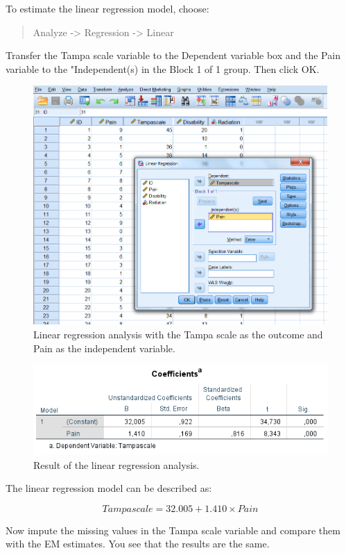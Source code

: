 \documentclass[
]{book}
\begin{document}
To estimate the linear regression model, choose:

\begin{quote}
Analyze -\textgreater{} Regression -\textgreater{} Linear
\end{quote}

Transfer the Tampa scale variable to the Dependent variable box and the
Pain variable to the "Independent(s) in the Block 1 of 1 group. Then
click OK.

\begin{figure}

{\centering \includegraphics[width=0.7\linewidth]{images/fig3.14} 

}

\caption{Linear regression analysis with the Tampa scale as the outcome and Pain as the independent variable.}\label{fig:fig3-14}
\end{figure}

\begin{figure}

{\centering \includegraphics[width=0.7\linewidth]{images/table3.3} 

}

\caption{Result of the linear regression analysis.}\label{fig:tab3-3}
\end{figure}

The linear regression model can be described as:

\[Tampascale = 32.005 + 1.410 × Pain\]

Now impute the missing values in the Tampa scale variable and compare
them with the EM estimates. You see that the results are the same.
\end{document}
